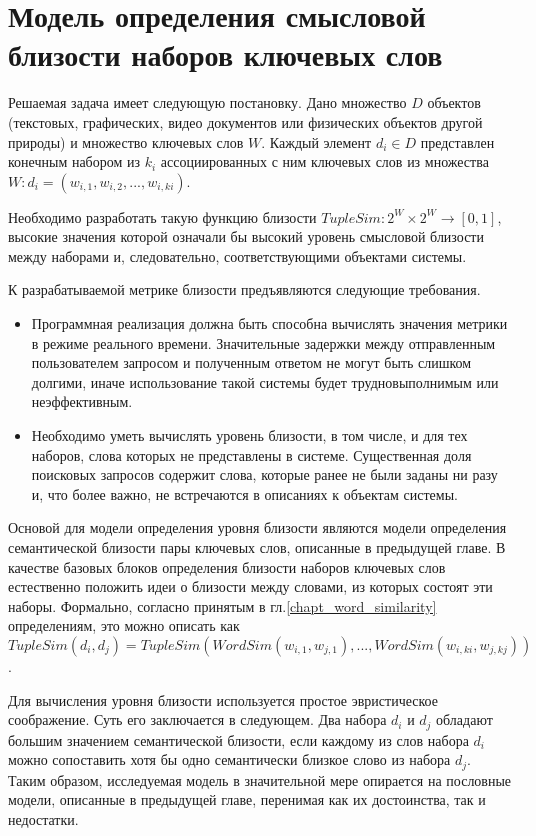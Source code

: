 \section{Модель определения смысловой близости наборов ключевых слов} \label{tuple_model}

Решаемая задача имеет следующую постановку. Дано множество $D$ объектов (текстовых, графических, видео документов или физических объектов другой природы) и  множество ключевых слов $W$. Каждый элемент $d_i \in D$ представлен конечным набором из $k_i$ ассоциированных с ним ключевых слов из множества $W: d_i = (w_{i,1},w_{i,2},...,w_{i,ki})$. 

Необходимо разработать такую функцию близости $TupleSim : 2^W \times 2^W \rightarrow [0, 1]$, высокие значения которой означали бы высокий уровень смысловой близости между наборами и, следовательно, соответствующими объектами системы. 

К разрабатываемой метрике близости предъявляются следующие требования.
\begin{itemize}
    \item Программная реализация должна быть способна вычислять значения метрики в режиме реального времени. Значительные задержки между отправленным пользователем запросом и полученным ответом не могут быть слишком долгими, иначе использование такой системы будет трудновыполнимым или неэффективным.
    \item Необходимо уметь вычислять уровень близости, в том числе, и для тех наборов, слова которых не представлены в системе. Существенная доля поисковых запросов содержит слова, которые ранее не были заданы ни разу и, что более важно, не встречаются в описаниях к объектам системы.
\end{itemize}


Основой для модели определения уровня близости являются модели определения семантической близости пары ключевых слов, описанные в предыдущей главе. В качестве базовых  блоков определения близости наборов ключевых слов естественно положить идеи о близости между словами, из которых состоят эти наборы. Формально, согласно принятым в гл.\ref{chapt_word_similarity} определениям, это можно описать как $TupleSim(d_i, d_j) = TupleSim(WordSim(w_{i,1}, w_{j,1}), ... , WordSim(w_{i,ki}, w_{j,kj}))$.

Для вычисления уровня близости используется простое эвристическое соображение. Суть его заключается в следующем. Два набора $d_i$ и $d_j$ обладают большим значением семантической близости, если каждому из слов набора $d_i$ можно сопоставить хотя бы одно семантически близкое слово из набора $d_j$. Таким образом, исследуемая модель в значительной мере опирается на пословные модели, описанные в предыдущей главе, перенимая как их достоинства, так и недостатки.

